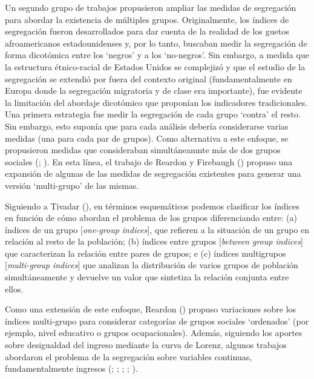 \documentclass[
  spanish,
  a4paper,%
  chapterprefix=true,%
  DIV=calc,%
  twoside]{scrbook}%
\begin{document}
Un segundo grupo de trabajos propusieron ampliar las medidas de
segregación para abordar la existencia de múltiples grupos.
Originalmente, los índices de segregación fueron desarrollados para dar
cuenta de la realidad de los guetos afroamericanos estadounidenses y,
por lo tanto, buscaban medir la segregación de forma dicotómica entre
los `negros' y a los `no-negros'. Sin embargo, a medida que la
estructura étnico-racial de Estados Unidos se complejizó y que el
estudio de la segregación se extendió por fuera del contexto original
(fundamentalmente en Europa donde la segregación migratoria y de clase
era importante), fue evidente la limitación del abordaje dicotómico que
proponían los indicadores tradicionales. Una primera estrategia fue
medir la segregación de cada grupo `contra' el resto. Sin embargo, esto
suponía que para cada análisis debería considerarse varias medidas (una
para cada par de grupos). Como alternativa a este enfoque, se
propusieron medidas que consideraban simultáneamnte más de dos grupos
sociales (; ). En esta línea, el trabajo de
Reardon y Firebaugh () propuso una expansión de algunas de las medidas de
segregación existentes para generar una versión `multi-grupo' de las
mismas.

Siguiendo a Tivadar (), en términos esquemáticos podemos
clasificar los índices en función de cómo abordan el problema de los
grupos diferenciando entre: (a) índices de un grupo {[}\emph{one-group
indices}{]}, que refieren a la situación de un grupo en relación al resto
de la población; (b) índices entre grupos {[}\emph{between group indices}{]} que
caracterizan la relación entre pares de grupos; e (c) índices
multigrupos {[}\emph{multi-group indices}{]} que analizan la distribución de
varios grupos de población simultáneamente y devuelve un valor que
sintetiza la relación conjunta entre ellos.

Como una extensión de este enfoque, Reardon () propuso variaciones
sobre los índices multi-grupo para considerar categorías de grupos
sociales `ordenados' (por ejemplo, nivel educativo o grupos
ocupacionales). Además, siguiendo los aportes sobre desigualdad del
ingreso mediante la curva de Lorenz, algunos trabajos abordaron el
problema de la segregación sobre variables continuas, fundamentalmente
ingresos (; ; ; ; ).
\end{document}
